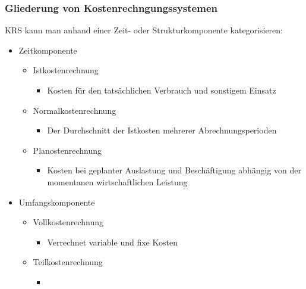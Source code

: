 \documentclass{article}
\begin{document}
	\subsubsection{Gliederung von Kostenrechngungssystemen}
	KRS kann man anhand einer Zeit- oder Strukturkomponente kategorisieren:
	\begin{itemize}
		\item{Zeitkomponente}
		\begin{itemize}
			\item{Istkostenrechnung}
			\begin{itemize}
				\item{Kosten für den tatsächlichen Verbrauch und sonstigem Einsatz}
			\end{itemize}
			\item{Normalkostenrechnung}
			\begin{itemize}
				\item{Der Durchschnitt der Istkosten mehrerer Abrechnungsperioden}
			\end{itemize}
			\item{Planostenrechnung}
			\begin{itemize}
				\item{Kosten bei geplanter Auslastung und Beschäftigung abhängig von der momentanen wirtschaftlichen Leistung}
			\end{itemize}
		\end{itemize}
		\item{Umfangskomponente}
		\begin{itemize}
			\item{Vollkostenrechnung}
			\begin{itemize}
				\item{Verrechnet variable und fixe Kosten}
			\end{itemize}
			\item{Teilkostenrechnung}
			\begin{itemize}
				\item{}
			\end{itemize}
		\end{itemize}
	\end{itemize}

	


	























  
\end{document}
